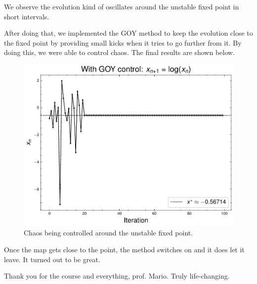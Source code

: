 \begin{enumerate}[(a)]
    We observe the evolution kind of oscillates around the unstable fixed point in short intervals.

    After doing that, we implemented the GOY method to keep the evolution close to the fixed
    point by providing small kicks when it tries to go further from it. By doing this,
    we were able to control chaos. The final results are shown below.

    \begin{figure}[!ht]
        \centering
        \includegraphics[scale=0.70]{images/goy_control.pdf}
        \caption{Chaos being controlled around the unstable fixed point.}
        \label{fig:4b}
    \end{figure}

    Once the map gets close to the point, the method switches on and it does let it leave. 
    It turned out to be great.

\end{enumerate}

Thank you for the course and everything, prof. Mario. Truly life-changing.


% 
% 

